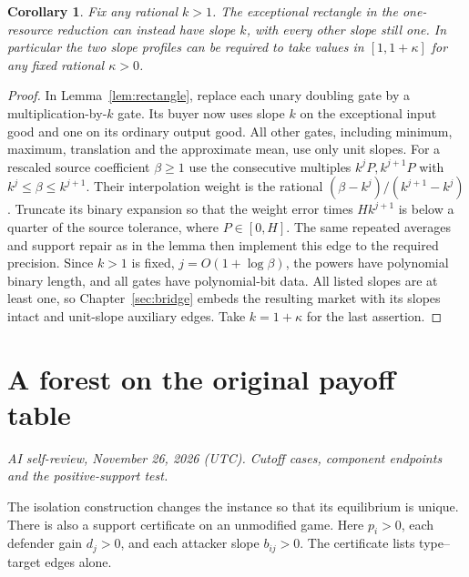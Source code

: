 \documentclass[11pt,oneside,openany,notitlepage]{report}
\newtheorem{corollary}[theorem]{Corollary}
\newcommand{\reviewdate}{November 26, 2026 (UTC)}
\newcommand{\reviewmark}[1]{\par\nopagebreak[4]\noindent
  {\footnotesize\itshape AI self-review, \reviewdate. #1\par}\nobreak\smallskip}
\begin{document}
\begin{corollary}\label{cor:close-slopes}
Fix any rational \(k>1\). The exceptional rectangle in the one-resource
reduction can instead have slope \(k\), with every other slope still one.
In particular the two slope profiles can be required to take values in
\([1,1+\kappa]\) for any fixed rational \(\kappa>0\).
\end{corollary}
\begin{proof}
In Lemma~\ref{lem:rectangle}, replace each unary doubling gate by a
multiplication-by-\(k\) gate. Its buyer now uses slope \(k\) on the
exceptional input good and one on its ordinary output good. All other
gates, including minimum, maximum, translation and the approximate
mean, use only unit slopes. For a rescaled source coefficient
\(\beta\ge1\) use the consecutive multiples \(k^jP,k^{j+1}P\) with
\(k^j\le\beta\le k^{j+1}\). Their interpolation weight is the rational
\((\beta-k^j)/(k^{j+1}-k^j)\). Truncate its binary expansion so that
the weight error times \(H k^{j+1}\) is below a quarter of the
source tolerance, where \(P\in[0,H]\). The same repeated averages and
support repair as in the lemma then implement this edge to the required
precision. Since \(k>1\) is fixed, \(j=O(1+\log\beta)\), the powers
have polynomial binary length, and all gates have polynomial-bit data.
All listed slopes are at least one, so Chapter~\ref{sec:bridge} embeds
the resulting market with its slopes intact and unit-slope auxiliary
edges. Take \(k=1+\kappa\) for the last assertion.
\end{proof}

\section{A forest on the original payoff table}\label{sec:same-forest}
\reviewmark{Cutoff cases, component endpoints and the positive-support test.}

The isolation construction changes the instance so that its equilibrium
is unique. There is also a support certificate on an unmodified game.
Here \(p_i>0\), each defender gain \(d_j>0\), and each attacker slope
\(b_{ij}>0\). The certificate lists type--target edges alone.
\end{document}
